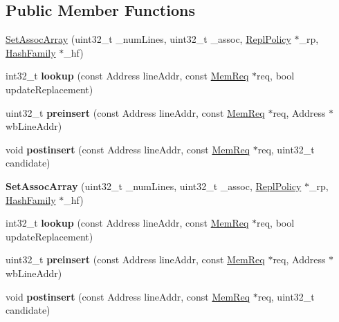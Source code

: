 \subsection*{Public Member Functions}
\begin{DoxyCompactItemize}
\item 
\hyperlink{classSetAssocArray_ae940b9d5ab4c189c406c01afe01e0186}{Set\-Assoc\-Array} (uint32\-\_\-t \-\_\-num\-Lines, uint32\-\_\-t \-\_\-assoc, \hyperlink{classReplPolicy}{Repl\-Policy} $\ast$\-\_\-rp, \hyperlink{classHashFamily}{Hash\-Family} $\ast$\-\_\-hf)
\item 
\hypertarget{classSetAssocArray_a6aa053ebaf8dce25ed36c3b8d9313655}{int32\-\_\-t {\bfseries lookup} (const Address line\-Addr, const \hyperlink{structMemReq}{Mem\-Req} $\ast$req, bool update\-Replacement)}\label{classSetAssocArray_a6aa053ebaf8dce25ed36c3b8d9313655}

\item 
\hypertarget{classSetAssocArray_ae19bd9b3076226a8a69bdcc4fc7f5bcb}{uint32\-\_\-t {\bfseries preinsert} (const Address line\-Addr, const \hyperlink{structMemReq}{Mem\-Req} $\ast$req, Address $\ast$wb\-Line\-Addr)}\label{classSetAssocArray_ae19bd9b3076226a8a69bdcc4fc7f5bcb}

\item 
\hypertarget{classSetAssocArray_a77e44df257b97ef7c9ed641cb6661109}{void {\bfseries postinsert} (const Address line\-Addr, const \hyperlink{structMemReq}{Mem\-Req} $\ast$req, uint32\-\_\-t candidate)}\label{classSetAssocArray_a77e44df257b97ef7c9ed641cb6661109}

\item 
\hypertarget{classSetAssocArray_ae940b9d5ab4c189c406c01afe01e0186}{{\bfseries Set\-Assoc\-Array} (uint32\-\_\-t \-\_\-num\-Lines, uint32\-\_\-t \-\_\-assoc, \hyperlink{classReplPolicy}{Repl\-Policy} $\ast$\-\_\-rp, \hyperlink{classHashFamily}{Hash\-Family} $\ast$\-\_\-hf)}\label{classSetAssocArray_ae940b9d5ab4c189c406c01afe01e0186}

\item 
\hypertarget{classSetAssocArray_a6aa053ebaf8dce25ed36c3b8d9313655}{int32\-\_\-t {\bfseries lookup} (const Address line\-Addr, const \hyperlink{structMemReq}{Mem\-Req} $\ast$req, bool update\-Replacement)}\label{classSetAssocArray_a6aa053ebaf8dce25ed36c3b8d9313655}

\item 
\hypertarget{classSetAssocArray_ae19bd9b3076226a8a69bdcc4fc7f5bcb}{uint32\-\_\-t {\bfseries preinsert} (const Address line\-Addr, const \hyperlink{structMemReq}{Mem\-Req} $\ast$req, Address $\ast$wb\-Line\-Addr)}\label{classSetAssocArray_ae19bd9b3076226a8a69bdcc4fc7f5bcb}

\item 
\hypertarget{classSetAssocArray_a77e44df257b97ef7c9ed641cb6661109}{void {\bfseries postinsert} (const Address line\-Addr, const \hyperlink{structMemReq}{Mem\-Req} $\ast$req, uint32\-\_\-t candidate)}\label{classSetAssocArray_a77e44df257b97ef7c9ed641cb6661109}

\end{DoxyCompactItemize}
